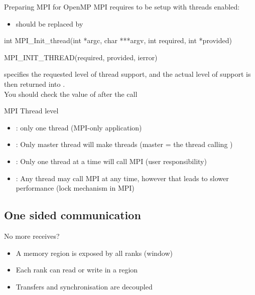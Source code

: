 \documentclass[aspectratio=43]{beamer}
\begin{document}
\begin{frame}[fragile]{Preparing MPI for OpenMP}
MPI requires to be setup with threads enabled:
\begin{itemize}
\item {} should be replaced by 
\end{itemize}
\begin{Cpplisting}[]{}
int MPI_Init_thread(int *argc, char ***argv, int required, int *provided)
\end{Cpplisting}
\begin{Fortranlisting}[]{}
MPI_INIT_THREAD(required, provided, ierror)
\end{Fortranlisting}

 specifies the requested level of thread support, and the actual level of support is then returned into .\\
You should check the value of  after the call
\end{frame}

\begin{frame}[fragile]{MPI Thread level}
\begin{itemize}
    \item {}: only one thread (MPI-only application)
    \item {}: Only master thread will make threads (master = the thread calling )
    \item {}: Only one thread at a time will call MPI (user responsibility)
    \item {}: Any thread may call MPI at any time, however that leads to slower performance (lock mechanism in MPI)
\end{itemize}
\end{frame}



\subsection{One sided communication}

\begin{frame}[fragile]{No more receives?}
\begin{itemize}
    \item A memory region is exposed by all ranks (window)
    \item Each rank can read or write in a region
    \item Transfers and synchronisation are decoupled
\end{itemize}
\end{frame}
\end{document}

